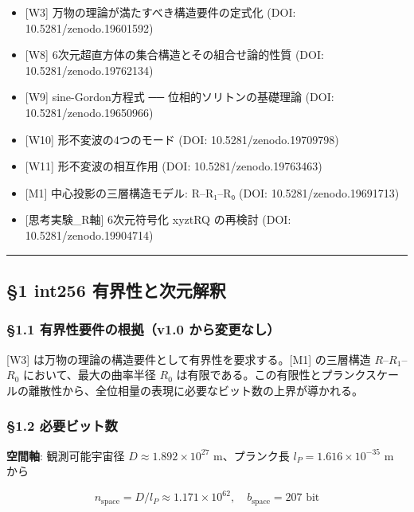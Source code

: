\documentclass[a4paper,11pt]{ltjsarticle}
\providecommand{\tightlist}{\setlength{\itemsep}{0pt}\setlength{\parskip}{0pt}}
\begin{document}
\begin{itemize}
\tightlist
\item
  {[}W3{]} 万物の理論が満たすべき構造要件の定式化 (DOI:
  10.5281/zenodo.19601592)
\item
  {[}W8{]} 6次元超直方体の集合構造とその組合せ論的性質 (DOI:
  10.5281/zenodo.19762134)
\item
  {[}W9{]} sine-Gordon方程式 ── 位相的ソリトンの基礎理論 (DOI:
  10.5281/zenodo.19650966)
\item
  {[}W10{]} 形不変波の4つのモード (DOI: 10.5281/zenodo.19709798)
\item
  {[}W11{]} 形不変波の相互作用 (DOI: 10.5281/zenodo.19763463)
\item
  {[}M1{]} 中心投影の三層構造モデル: R--R₁--R₀ (DOI:
  10.5281/zenodo.19691713)
\item
  {[}思考実験\_R軸{]} 6次元符号化 xyztRQ の再検討 (DOI:
  10.5281/zenodo.19904714)
\end{itemize}

\begin{center}\rule{0.5\linewidth}{0.5pt}\end{center}

\subsection{§1 int256
有界性と次元解釈}\label{int256-ux6709ux754cux6027ux3068ux6b21ux5143ux89e3ux91c8}

\subsubsection{§1.1 有界性要件の根拠（v1.0
から変更なし）}\label{ux6709ux754cux6027ux8981ux4ef6ux306eux6839ux62e0v1.0-ux304bux3089ux5909ux66f4ux306aux3057}

{[}W3{]} は万物の理論の構造要件として有界性を要求する。{[}M1{]}
の三層構造 \(R\)--\(R_1\)--\(R_0\) において、最大の曲率半径 \(R_0\)
は有限である。この有限性とプランクスケールの離散性から、全位相量の表現に必要なビット数の上界が導かれる。

\subsubsection{§1.2
必要ビット数}\label{ux5fc5ux8981ux30d3ux30c3ux30c8ux6570}

\textbf{空間軸}: 観測可能宇宙径 \(D \approx 1.892 \times 10^{27}\)
m、プランク長 \(l_P = 1.616 \times 10^{-35}\) m から

\[n_{\text{space}} = D / l_P \approx 1.171 \times 10^{62}, \quad b_{\text{space}} = 207 \text{ bit}\]
\end{document}
